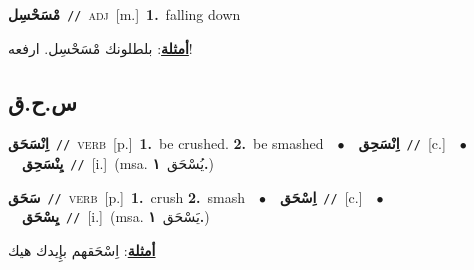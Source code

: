 \documentclass[10pt,a4paper,twoside]{article} %
\begin{document}
\begin{multicols}{2}
{\setlength\topsep{0pt}\textbf{\foreignlanguage{arabic}{مْسَحْسِل}}\ {\color{gray}\texttt{//}\color{black}}\ \textsc{adj}\ [m.]\ \textbf{1.}~falling down\  \begin{flushright}\color{gray}\foreignlanguage{arabic}{\textbf{\underline{\foreignlanguage{arabic}{أمثلة}}}: بلطلونك مْسَحْسِل. ارفعه!}\end{flushright}\color{black}} \vspace{2mm}

\vspace{-3mm}
\subsection*{\color{blue}\foreignlanguage{arabic}{س.ح.ق}\color{blue}{}} 

{\setlength\topsep{0pt}\textbf{\foreignlanguage{arabic}{اِنْسَحَق}}\ {\color{gray}\texttt{//}\color{black}}\ \textsc{verb}\ [p.]\ \textbf{1.}~be crushed.  \textbf{2.}~be smashed\ \ $\bullet$\ \ \setlength\topsep{0pt}\textbf{\foreignlanguage{arabic}{اِنْسَحِق}}\ {\color{gray}\texttt{//}\color{black}}\ [c.]\ \ $\bullet$\ \ \setlength\topsep{0pt}\textbf{\foreignlanguage{arabic}{يِنْسَحِق}}\ {\color{gray}\texttt{//}\color{black}}\ [i.]\ \color{gray}(msa. \foreignlanguage{arabic}{يُسْحَق}~\foreignlanguage{arabic}{\textbf{١.}})\color{black}\ } \vspace{2mm}

{\setlength\topsep{0pt}\textbf{\foreignlanguage{arabic}{سَحَق}}\ {\color{gray}\texttt{//}\color{black}}\ \textsc{verb}\ [p.]\ \textbf{1.}~crush  \textbf{2.}~smash\ \ $\bullet$\ \ \setlength\topsep{0pt}\textbf{\foreignlanguage{arabic}{اِسْحَق}}\ {\color{gray}\texttt{//}\color{black}}\ [c.]\ \ $\bullet$\ \ \setlength\topsep{0pt}\textbf{\foreignlanguage{arabic}{يِسْحَق}}\ {\color{gray}\texttt{//}\color{black}}\ [i.]\ \color{gray}(msa. \foreignlanguage{arabic}{يَسْحَق}~\foreignlanguage{arabic}{\textbf{١.}})\color{black}\  \begin{flushright}\color{gray}\foreignlanguage{arabic}{\textbf{\underline{\foreignlanguage{arabic}{أمثلة}}}: اِسْحَقهم بإِيدك هيك}\end{flushright}\color{black}} \vspace{2mm}


\end{multicols}
\end{document}
